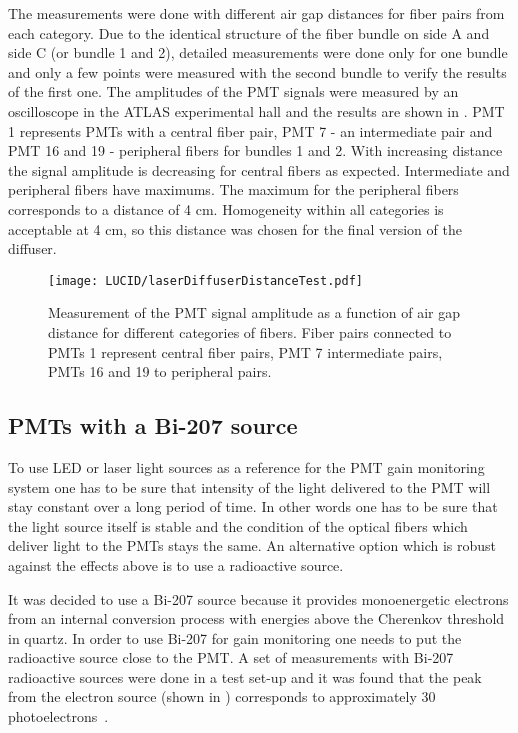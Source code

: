 The measurements were done with different air gap distances for fiber pairs from each category. 
Due to the identical structure of the fiber bundle on side A and side C (or bundle 1 and 2), detailed measurements
were done only for one bundle and only a few points were measured with the second bundle to verify the results of the first one. 
The amplitudes of the PMT signals were measured by an oscilloscope in the ATLAS experimental hall
and the results are shown in . 
PMT 1 represents PMTs with a central fiber pair, PMT 7 - an intermediate pair and PMT 16 and 19 - peripheral fibers for bundles 1 and 2. 
With increasing distance the signal amplitude is decreasing for central fibers as expected. 
Intermediate and peripheral fibers have maximums. The maximum for the peripheral fibers corresponds to a distance of 4 cm.
Homogeneity within all categories is acceptable at 4 cm, so this distance was chosen for the final version of the diffuser.

\begin{figure}
\centering
\texttt{[image: LUCID/laserDiffuserDistanceTest.pdf]}
\caption{Measurement of the PMT signal amplitude as a function of air gap distance for different categories of fibers. Fiber pairs connected to PMTs 1 represent 
central fiber pairs, PMT 7 intermediate pairs, PMTs 16 and 19 to peripheral pairs.}
\label{fig:laserDiffuserDistanceTest}
\end{figure}

\subsection{PMTs with a Bi-207 source}
\label{subsec:bi207Calibration}

To use LED or laser light sources as a reference for the PMT gain monitoring system one has to be sure that intensity of the light delivered to the PMT 
will stay constant over a long period of time. In other words one has to be sure that the light source itself is stable and the condition of 
the optical fibers which deliver light to the PMTs stays the same.
An alternative option which is robust against the effects above is to use a radioactive source.

It was decided to use a Bi-207 source because it provides monoenergetic electrons from an internal conversion process 
with energies above the Cherenkov threshold in quartz.
In order to use Bi-207 for gain monitoring one needs to put the radioactive source close to the PMT.
A set of measurements with Bi-207 radioactive sources were done in a test set-up and it was found that the peak from the electron source 
(shown in ) corresponds to approximately 30 photoelectrons~\cite{Alberghi:2016tad}.

